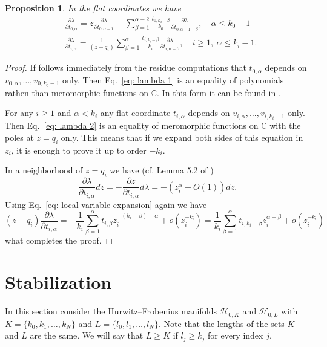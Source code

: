 \documentclass[12pt,a4paper]{amsart}
\newcommand{\CC}{{\mathbb{C}}}
\def\H{{\mathcal H}}
\newcommand{\p}{{\partial}}
\newcommand{\<}{\left<}
\renewcommand{\>}{\right>}
\newtheorem{proposition}[theorem]{Proposition}
\numberwithin{equation}{section}
\begin{document}
\begin{proposition}
    In the flat coordinates we have
    \begin{align}
        & \frac{\p \lambda}{\p t_{0,\alpha}} = z \frac{\p \lambda}{\p t_{0,\alpha-1}} - \sum _{\beta=1}^{\alpha-2} \frac{t_{0,k_0-\beta}}{k_0}  \frac{\p \lambda}{\p t_{0,\alpha-1-\beta}}, \quad \alpha \le k_0-1
        \label{eq: lambda 1}
        \\
        & \frac{\p \lambda}{\p t_{i,\alpha}} = \frac{1}{\left(z-q_{i}\right)} \sum _{\beta=1}^{\alpha} \frac{t_{i,k_i-\beta}}{k_i} \frac{\p \lambda}{\p t_{i,\alpha-\beta}}, \quad i \ge 1, \ \alpha \le k_i-1.
        \label{eq: lambda 2}
    \end{align}
\end{proposition}
\begin{proof}
    If follows immediately from the residue computations that $t_{0,\alpha}$ depends on $v_{0,\alpha},\dots,v_{0,k_0-1}$ only. Then Eq.~\eqref{eq: lambda 1} is an equality of polynomials rathen than meromorphic functions on $\CC$. In this form it can be found in \cite[Section 4.3]{DVV}. 

    For any $i \ge 1$ and $\alpha < k_i$ any flat coordinate $t_{i,\alpha}$ depends on $v_{i,\alpha},\dots,v_{i,k_i-1}$ only. Then Eq.~\eqref{eq: lambda 2} is an equality of meromorphic functions on $\CC$ with the poles at $z = q_i$ only. This means that if we expand both sides of this equation in $z_i$, it is enough to prove it up to order $-k_i$.
    
    In a neighborhood of $z = q_i$ we have (cf. Lemma 5.2 of \cite{D2})
    \[
        \frac{\p \lambda}{\p t_{i,\alpha}} dz = - \frac{\p z}{\p t_{i,\alpha}} d\lambda = - (z_i^{\alpha} + O(1)) dz.
    \]
    Using Eq.~\eqref{eq: local variable expansion} again we have
    \[
        (z-q_i) \frac{\p \lambda}{\p t_{i,\alpha}} = - \frac{1}{k_i} \sum_{\beta=1}^{\alpha} t_{i,\beta} z_i^{-(k_i-\beta) + \alpha} + o(z_i^{-k_i}) = \frac{1}{k_i} \sum_{\beta=1}^{\alpha} t_{i,k_i-\beta} z_i^{\alpha-\beta}  + o(z_i^{-k_i})
    \]
    what completes the proof.
\end{proof}



\section{Stabilization}
In this section consider the Hurwitz--Frobenius manifolds $\H_{0,K}$ and $\H_{0,L}$ with $K = \lbrace k_0,k_1,\dots,k_N \rbrace$ and $L = \lbrace l_0,l_1,\dots,l_N \rbrace$. Note that the lengths of the sets $K$ and $L$ are the same. We will say that $L \ge K$ if $l_j \ge k_j$ for every index $j$.
\end{document}
